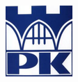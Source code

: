 \thispagestyle{empty}
\begin{titlepage}

  \condTWOSIDE{\changetext{}{19mm}{}{19mm}{}}

  \vspace{1cm}
  \begin{minipage}{0.2\textwidth}
    \includegraphics[width=\linewidth]{gfx/LOGO_UNIVERSITY} \\ 
  \end{minipage}
  \begin{minipage}{0.6\textwidth}
  	\begin{center}
    \textbf{\myUni}\\
    ~\myFaculty~
	\end{center}
  \end{minipage}
  \begin{minipage}{0.2\textwidth}

\end{minipage}
\end{titlepage}

